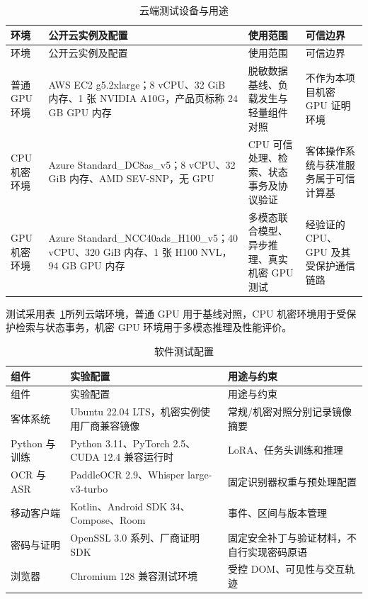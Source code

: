 \begin{longtable}[]{@{}
  >{\RaggedRight\arraybackslash}p{}
  >{\RaggedRight\arraybackslash}p{}
  >{\RaggedRight\arraybackslash}p{}
  >{\RaggedRight\arraybackslash}p{}@{}}
\caption{云端测试设备与用途}\label{tab:3-2}\tabularnewline
\toprule\noalign{}
环境 & 公开云实例及配置 & 使用范围 & 可信边界 \\
\midrule\noalign{}
\endfirsthead
\toprule\noalign{}
环境 & 公开云实例及配置 & 使用范围 & 可信边界 \\
\midrule\noalign{}
\endhead
\bottomrule\noalign{}
\endlastfoot
普通 GPU 环境 & AWS EC2 g5.2xlarge；8 vCPU、32 GiB 内存、1 张 NVIDIA A10G，产品页标称 24 GB GPU 内存 & 脱敏数据基线、负载发生与轻量组件对照 & 不作为本项目机密 GPU 证明环境 \\
CPU 机密环境 & Azure Standard\_\allowbreak{}DC8as\_\allowbreak{}v5；8 vCPU、32 GiB 内存、AMD SEV-SNP，无 GPU & CPU 可信处理、检索、状态事务及协议验证 & 客体操作系统与获准服务属于可信计算基 \\
GPU 机密环境 & Azure Standard\_\allowbreak{}NCC40ads\_\allowbreak{}H100\_\allowbreak{}v5；40 vCPU、320 GiB 内存、1 张 H100 NVL，94 GB GPU 内存 & 多模态联合模型、异步推理、真实机密 GPU 测试 & 经验证的 CPU、GPU 及其受保护通信链路 \\
\end{longtable}

测试采用表~\ref{tab:3-2}所列云端环境，普通 GPU 用于基线对照，CPU 机密环境用于受保护检索与状态事务，机密 GPU 环境用于多模态推理及性能评价。

\begin{longtable}[]{@{}
  >{\RaggedRight\arraybackslash}p{}
  >{\RaggedRight\arraybackslash}p{}
  >{\RaggedRight\arraybackslash}p{}@{}}
\caption{软件测试配置}\label{tab:3-3}\tabularnewline
\toprule\noalign{}
组件 & 实验配置 & 用途与约束 \\
\midrule\noalign{}
\endfirsthead
\toprule\noalign{}
组件 & 实验配置 & 用途与约束 \\
\midrule\noalign{}
\endhead
\bottomrule\noalign{}
\endlastfoot
客体系统 & Ubuntu 22.04 LTS，机密实例使用厂商兼容镜像 & 常规/机密对照分别记录镜像摘要 \\
Python 与训练 & Python 3.11、PyTorch 2.5、CUDA 12.4 兼容运行时 & LoRA、任务头训练和推理 \\
OCR 与 ASR & PaddleOCR 2.9、Whisper large-v3-turbo & 固定识别器权重与预处理配置 \\
移动客户端 & Kotlin、Android SDK 34、Compose、Room & 事件、区间与版本管理 \\
密码与证明 & OpenSSL 3.0 系列、厂商证明 SDK & 固定安全补丁与验证材料，不自行实现密码原语 \\
浏览器 & Chromium 128 兼容测试环境 & 受控 DOM、可见性与交互轨迹 \\
\end{longtable}

